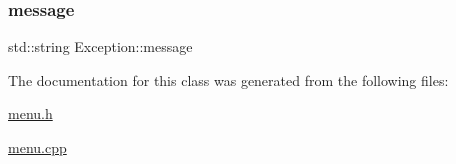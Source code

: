 \subsubsection{\texorpdfstring{message}{message}}
{\footnotesize\ttfamily std\+::string Exception\+::message\hspace{0.3cm}{\ttfamily [private]}}



The documentation for this class was generated from the following files\+:\begin{DoxyCompactItemize}
\item 
\hyperlink{menu_8h}{menu.\+h}\item 
\hyperlink{menu_8cpp}{menu.\+cpp}\end{DoxyCompactItemize}
